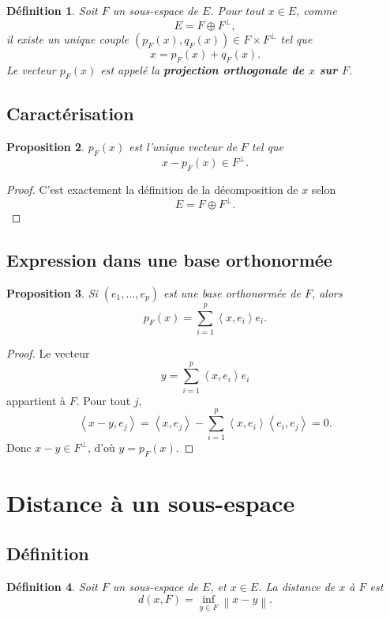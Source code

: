 \documentclass[11pt,a4paper]{article}
\newtheorem{definition}{Définition}[section]
\newtheorem{proposition}[definition]{Proposition}
\theoremstyle{remark}
\newcommand{\Norm}[1]{\left\|#1\right\|}
\newcommand{\scal}[2]{\left\langle #1,#2\right\rangle}
\newcommand{\Orth}{\perp}
\begin{document}
\begin{definition}
Soit \(F\) un sous-espace de \(E\). Pour tout \(x\in E\), comme
\[
E=F\oplus F^\Orth,
\]
il existe un unique couple \((p_F(x),q_F(x))\in F\times F^\Orth\) tel que
\[
x=p_F(x)+q_F(x).
\]
Le vecteur \(p_F(x)\) est appelé la \textbf{projection orthogonale de \(x\) sur \(F\)}.
\end{definition}

\subsection{Caractérisation}

\begin{proposition}
\(p_F(x)\) est l’unique vecteur de \(F\) tel que
\[
x-p_F(x)\in F^\Orth.
\]
\end{proposition}

\begin{proof}
C’est exactement la définition de la décomposition de \(x\) selon
\[
E=F\oplus F^\Orth.
\]
\end{proof}

\subsection{Expression dans une base orthonormée}

\begin{proposition}
Si \((e_1,\dots,e_p)\) est une base orthonormée de \(F\), alors
\[
p_F(x)=\sum_{i=1}^p \scal{x}{e_i}e_i.
\]
\end{proposition}

\begin{proof}
Le vecteur
\[
y=\sum_{i=1}^p \scal{x}{e_i}e_i
\]
appartient à \(F\). Pour tout \(j\),
\[
\scal{x-y}{e_j}=\scal{x}{e_j}-\sum_{i=1}^p \scal{x}{e_i}\scal{e_i}{e_j}=0.
\]
Donc \(x-y\in F^\Orth\), d’où \(y=p_F(x)\).
\end{proof}

\section{Distance à un sous-espace}

\subsection{Définition}

\begin{definition}
Soit \(F\) un sous-espace de \(E\), et \(x\in E\).  
La distance de \(x\) à \(F\) est
\[
d(x,F)=\inf_{y\in F}\Norm{x-y}.
\]
\end{definition}
\end{document}
